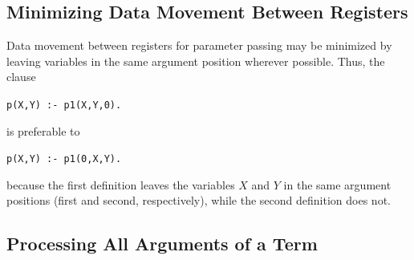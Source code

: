 \subsection{Minimizing Data Movement Between Registers}

Data movement between registers for parameter passing may be minimized by
leaving variables in the same argument position wherever possible.
Thus, the clause
\begin{center}
{\tt p(X,Y) :- p1(X,Y,0).}
\end{center}
is preferable to
\begin{center}
{\tt p(X,Y) :- p1(0,X,Y).}
\end{center}
because the first definition leaves the variables $X$ and $Y$
in the same argument positions (first and second, respectively),
while the second definition does not.

\subsection{Processing All Arguments of a Term}

